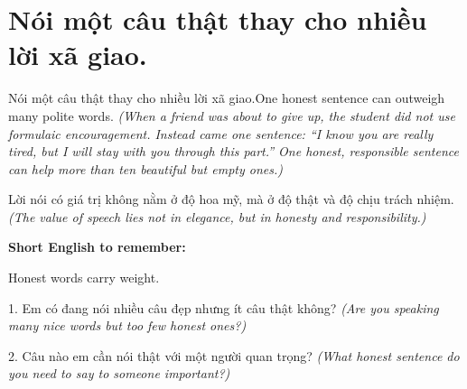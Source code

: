 \section{Nói một câu thật thay cho nhiều lời xã giao.}
\begin{truyen}{Nói một câu thật thay cho nhiều lời xã giao.}{One honest sentence can outweigh many polite words.}
\textit{(When a friend was about to give up, the student did not use formulaic encouragement. Instead came one sentence: “I know you are really tired, but I will stay with you through this part.” One honest, responsible sentence can help more than ten beautiful but empty ones.)}
\end{truyen}
\begin{baihoc}
Lời nói có giá trị không nằm ở độ hoa mỹ, mà ở độ thật và độ chịu trách nhiệm.
\textit{(The value of speech lies not in elegance, but in honesty and responsibility.)}
\end{baihoc}
\begin{ghinhoanh}
\textbf{Short English to remember:}

Honest words carry weight.
\end{ghinhoanh}
\begin{tuhocnhanh}
1. Em có đang nói nhiều câu đẹp nhưng ít câu thật không? \textit{(Are you speaking many nice words but too few honest ones?)}

2. Câu nào em cần nói thật với một người quan trọng? \textit{(What honest sentence do you need to say to someone important?)}
\end{tuhocnhanh}
\ngancach
